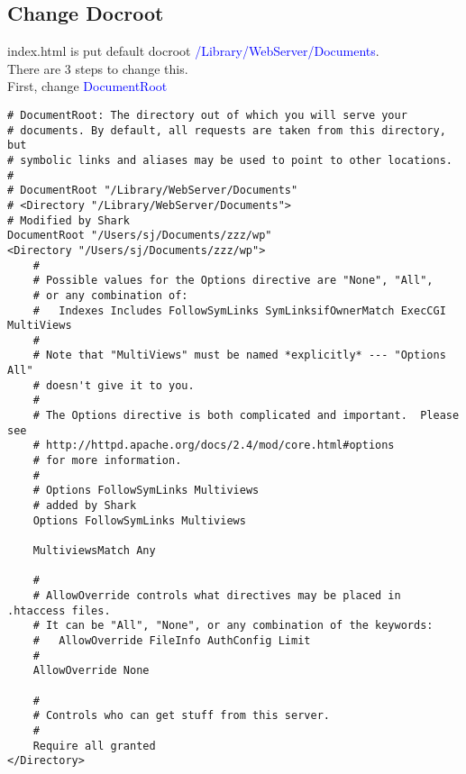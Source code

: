     \subsection{Change Docroot}
index.html is put default docroot \textcolor{blue}{/Library/WebServer/Documents}. \\
There are 3 steps to change this.  \\
First, change \textcolor{blue}{DocumentRoot} 
\begin{lstlisting}
# DocumentRoot: The directory out of which you will serve your
# documents. By default, all requests are taken from this directory, but
# symbolic links and aliases may be used to point to other locations.
#
# DocumentRoot "/Library/WebServer/Documents"
# <Directory "/Library/WebServer/Documents">
# Modified by Shark
DocumentRoot "/Users/sj/Documents/zzz/wp"
<Directory "/Users/sj/Documents/zzz/wp">
    #
    # Possible values for the Options directive are "None", "All",
    # or any combination of:
    #   Indexes Includes FollowSymLinks SymLinksifOwnerMatch ExecCGI MultiViews
    #
    # Note that "MultiViews" must be named *explicitly* --- "Options All"
    # doesn't give it to you.
    #
    # The Options directive is both complicated and important.  Please see
    # http://httpd.apache.org/docs/2.4/mod/core.html#options
    # for more information.
    #
    # Options FollowSymLinks Multiviews
    # added by Shark
    Options FollowSymLinks Multiviews

    MultiviewsMatch Any

    #
    # AllowOverride controls what directives may be placed in .htaccess files.
    # It can be "All", "None", or any combination of the keywords:
    #   AllowOverride FileInfo AuthConfig Limit
    #
    AllowOverride None

    #
    # Controls who can get stuff from this server.
    #
    Require all granted
</Directory>
\end{lstlisting}

